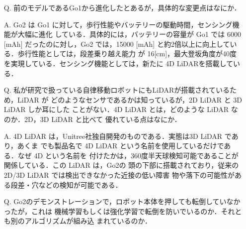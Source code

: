 \documentclass{jsarticle}
\begin{document}
\begin{itemize}
  \addtolength{\itemindent}{5.4zw}
  \item [Q.]前のモデルであるGo1から進化したとあるが，具体的な変更点はなにか．
  \vspace*{1zh}

  \item [A.]Go2 は Go1 に対して，歩行性能やバッテリーの駆動時間，センシング機能が大幅に進化
  \hspace*{5.5zw}している．具体的には，バッテリーの容量が Go1 では 6000 [mAh] だったのに対し，Go2
  \hspace*{5.5zw}では，15000 [mAh] と約2倍以上に向上している．歩行性能としては，段差乗り越え能力
  \hspace*{5.5zw}が 16[cm]，最大登坂角度が40度を実現している．センシング機能としては，新たに 4D 
  \hspace*{5.5zw}LiDARを搭載している．\\
  \vspace*{1zh}

  \item [Q.]私が研究で扱っている自律移動ロボットにもLiDARが搭載されているため，LiDAR が 
  \hspace*{5.5zw}どのようなセンサであるかは知っているが，2D LiDAR と 3D LiDAR しか耳にした
  \hspace*{5.5zw}ことがない．4D LiDAR とは，どのような LiDAR なのか．2D，3D LiDAR と比べて
  \hspace*{5.5zw}優れている点はなにか．
  \vspace*{1zh}

  \item [A.]4D LiDAR は，Unitree社独自開発のものである．実態は3D LiDAR であり，あくま
  \hspace*{5.5zw}でも製品名で 4D LiDAR という名前を使用しているだけである．なぜ 4D という名前を
  \hspace*{5.5zw}付けたかは，360度半天球検知可能であることが関係している．この LiDAR は，Go2の
  \hspace*{5.5zw}頭の下部に搭載されており，従来の2D/3D LiDAR では検出できなかった近接の低い障害
  \hspace*{5.5zw}物や落下の可能性がある段差・穴などの検知が可能である．\\
  \vspace*{1zh}

  \item [Q.]Go2のデモンストレーションで，ロボット本体を押しても転倒していなかったが，これは
  \hspace*{5.5zw}機械学習もしくは強化学習で転倒を防いでいるのか．それとも別のアルゴリズムが組み込
  \hspace*{5.5zw}まれているのか．
  \hspace*{5.5zw}
  \vspace*{1zh}


\end{itemize}
\end{document}
